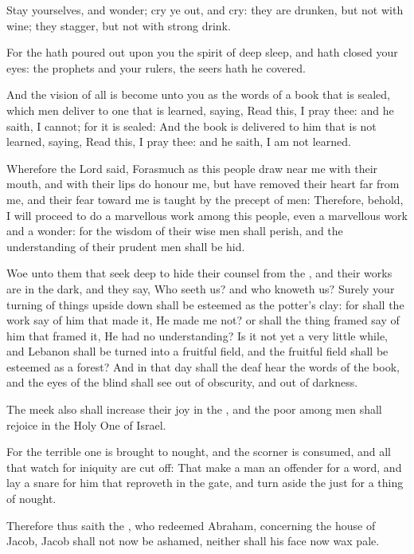 \Verse Stay yourselves, and wonder; cry ye out, and cry: they are drunken, but not with wine; they stagger, but not with strong drink.

\Verse For the \LORD hath poured out upon you the spirit of deep sleep, and hath closed your eyes: the prophets and your rulers, the seers hath he covered.

\Verse And the vision of all is become unto you as the words of a book that is sealed, which men deliver to one that is learned, saying, Read this, I pray thee: and he saith, I cannot; for it is sealed: \Verse And the book is delivered to him that is not learned, saying, Read this, I pray thee: and he saith, I am not learned.

\Verse Wherefore the Lord said, Forasmuch as this people draw near me with their mouth, and with their lips do honour me, but have removed their heart far from me, and their fear toward me is taught by the precept of men: \Verse Therefore, behold, I will proceed to do a marvellous work among this people, even a marvellous work and a wonder: for the wisdom of their wise men shall perish, and the understanding of their prudent men shall be hid.

\Verse Woe unto them that seek deep to hide their counsel from the \LORD, and their works are in the dark, and they say, Who seeth us? and who knoweth us?  \Verse Surely your turning of things upside down shall be esteemed as the potter's clay: for shall the work say of him that made it, He made me not? or shall the thing framed say of him that framed it, He had no understanding?  \Verse Is it not yet a very little while, and Lebanon shall be turned into a fruitful field, and the fruitful field shall be esteemed as a forest?  \Verse And in that day shall the deaf hear the words of the book, and the eyes of the blind shall see out of obscurity, and out of darkness.

\Verse The meek also shall increase their joy in the \LORD, and the poor among men shall rejoice in the Holy One of Israel.

\Verse For the terrible one is brought to nought, and the scorner is consumed, and all that watch for iniquity are cut off: \Verse That make a man an offender for a word, and lay a snare for him that reproveth in the gate, and turn aside the just for a thing of nought.

\Verse Therefore thus saith the \LORD, who redeemed Abraham, concerning the house of Jacob, Jacob shall not now be ashamed, neither shall his face now wax pale.

